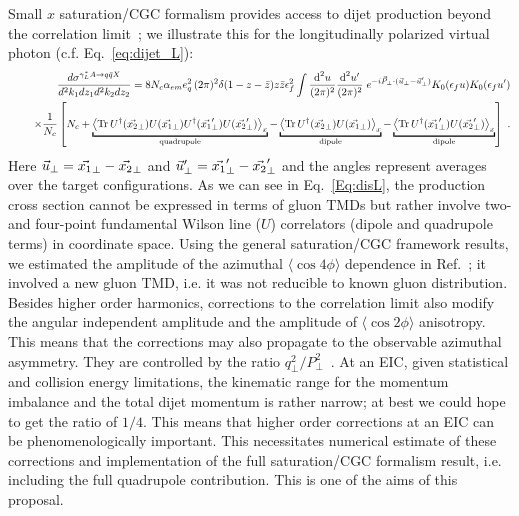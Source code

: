{ 
	Small $x$ saturation/CGC formalism provides access to dijet production beyond the
	correlation limit~\cite{Dominguez:2011wm}; we illustrate this for the longitudinally 
	polarized virtual photon (c.f. Eq.~\eqref{eq:dijet_L}): 
	\begin{eqnarray}
&&\frac{d\sigma ^{\gamma_{L}^{\ast }A\rightarrow q\bar{q}X}}{d^2k_1dz_1d^2k_2dz_2}
= 8N_{c}\alpha _{em}e_{q}^{2} \, (2\pi)^2 \delta(1 -z- \bar{z}) 
z \bar{z} \epsilon_f^2
\int \frac{\text{d}^{2}u}{(2\pi)^{2}}\frac{\text{d}^{2}u^{\prime }}{(2\pi )^{2}}
\; e^{-i \v{P}\cdot(\v{u}-\v{u}^{\prime})}
 K_0(\epsilon_f u )   K_0(\epsilon_f u^\prime)  \\
&&~~~~\times 
\frac{1}{N_c}\left[
N_c+
\underbracket{
\left< {\rm Tr}\,
U^\dagger(\v{x_2})  U(\v{x_1}) U^\dagger(\v{x_1}^{\prime})  U(\v{x_2}^{\prime})
\right>_x}_{\rm quadrupole} 
-
\underbracket{\left< {\rm Tr}\,
U^\dagger(\v{x_2})  U(\v{x_1}) \right>_x}_{\rm dipole}
-
\underbracket{
\left< {\rm Tr}\,
U^\dagger(\v{x_1}^\prime)  U(\v{x_2}^\prime) \right>_x }_{\rm dipole}
\right] ~.  \label{Eq:disL} \notag
\end{eqnarray}
Here $ \vec {u}_\perp = \vec {x_1}_\perp - \vec {x_2}_\perp $ and $ \vec {u}_\perp ^\prime= \vec {x_1}_\perp ^\prime- \vec {x_2}_\perp ^\prime$ and the angles represent averages over the 
target configurations. 
As we can see in Eq.~\eqref{Eq:disL},  the production cross section cannot be expressed in terms of  
	gluon TMDs but rather involve two- and four-point fundamental Wilson line ($U$) correlators (dipole and quadrupole terms)  in coordinate space. 
	Using the general saturation/CGC framework results,  we 
	estimated the amplitude of the azimuthal $\langle \cos 4\phi  \rangle$
	dependence in Ref.~\cite{Dumitru:2016jku}; it involved a new gluon TMD, i.e. it was not reducible to known gluon distribution. 
	Besides higher order harmonics, corrections to the correlation limit also 
	modify the angular independent amplitude and the amplitude of $\langle \cos 2\phi  \rangle$ anisotropy.
	This means that the corrections may also propagate to the observable azimuthal asymmetry.  
	They are controlled by the ratio $q_\perp^2/P_\perp^2$~\cite{Dumitru:2016jku}.    
	At an EIC, given statistical and collision energy limitations,  the kinematic range for the momentum imbalance and the 
	total dijet momentum is rather narrow; at best we could hope to get the ratio of $1/4$.
	This means that higher order corrections at an EIC can be phenomenologically important. 
	This necessitates numerical estimate of these corrections and implementation of the 
	full saturation/CGC formalism result, i.e. including the   full quadrupole contribution.   
	This is one of the aims of this proposal. 
	}




